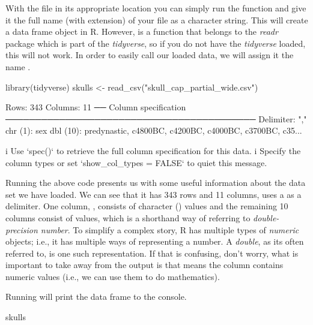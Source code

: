 With the file in its appropriate location you can simply run the function  and give it the full name (with extension) of your file as a character string. This will create a data frame object in R. However,  is a function that belongs to the \textit{readr} package which is part of the \textit{tidyverse}, so if you do not have the \textit{tidyverse} loaded, this will not work. In order to easily call our loaded data, we will assign it the name .

\begin{inR}
library(tidyverse)
skulls <- read_csv("skull_cap_partial_wide.csv")
\end{inR}

\begin{outR}
Rows: 343 Columns: 11                                             
── Column specification ──────────────────────────────────────────
Delimiter: ","
chr  (1): sex
dbl (10): predynastic, c4800BC, c4200BC, c4000BC, c3700BC, c35...

i Use `spec()` to retrieve the full column specification for this data.
i Specify the column types or set `show_col_types = FALSE` to quiet this message.
\end{outR}

Running the above code presents us with some useful information about the data set we have loaded.  We can see that it has 343 rows and 11 columns, uses a \R{,} as a delimiter. One column, , consists of character () values and the remaining 10 columns consist of  values, which is a shorthand way of referring to \textit{double-precision number}. To simplify a complex story, R has multiple types of \textit{numeric} objects; i.e., it has multiple ways of representing a number. A \textit{double}, as its often referred to, is one such representation. If that is confusing, don't worry, what is important to take away from the output is that  means the column contains numeric values (i.e., we can use them to do mathematics).

\clearpage

Running  will print the data frame to the console.

\begin{inR}
skulls
\end{inR}

